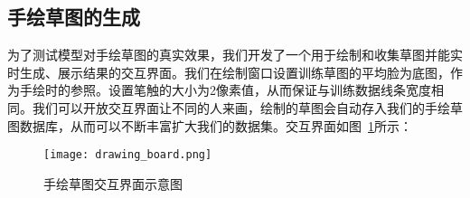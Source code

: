 \subsection{手绘草图的生成}

为了测试模型对手绘草图的真实效果，我们开发了一个用于绘制和收集草图并能实时生成、展示结果的交互界面。我们在绘制窗口设置训练草图的平均脸为底图，作为手绘时的参照。设置笔触的大小为2像素值，从而保证与训练数据线条宽度相同。我们可以开放交互界面让不同的人来画，绘制的草图会自动存入我们的手绘草图数据库，从而可以不断丰富扩大我们的数据集。交互界面如图~\ref{fig:drawing_board}所示：
~\\
\begin{figure}[htb]
	\centering
	\texttt{[image: drawing\_board.png]}
	\caption{手绘草图交互界面示意图}
	\label{fig:drawing_board}
\end{figure}





